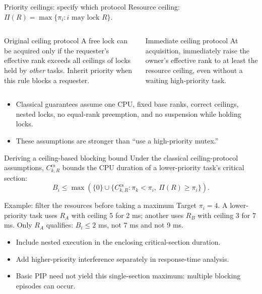 \documentclass[aspectratio=169,11pt]{beamer}
\begin{document}
\begin{frame}{Priority ceilings: specify which protocol}
  \small Resource ceiling: $\Pi(R)=\max\{\pi_i:i\text{ may lock }R\}$.
  \begin{columns}[T,onlytextwidth]
    \begin{block}{Original ceiling protocol}
      A free lock can be acquired only if the requester's effective rank exceeds all ceilings of locks held by \emph{other} tasks. Inherit priority when this rule blocks a requester.
    \end{block}
    \begin{block}{Immediate ceiling protocol}
      At acquisition, immediately raise the owner's effective rank to at least the resource ceiling, even without a waiting high-priority task.
    \end{block}
  \end{columns}
  \begin{itemize}
    \item Classical guarantees assume one CPU, fixed base ranks, correct ceilings, nested locks, no equal-rank preemption, and no suspension while holding locks.
    \item These assumptions are stronger than ``use a high-priority mutex.''
  \end{itemize}
\end{frame}

\begin{frame}{Deriving a ceiling-based blocking bound}
  \small Under the classical ceiling-protocol assumptions, $C_{k,R}^{\mathrm{cs}}$ bounds the CPU duration of a lower-priority task's critical section:
  \[
    B_i\le\max\left(\{0\}\cup
      \{C_{k,R}^{\mathrm{cs}}:\pi_k<\pi_i,\ \Pi(R)\ge\pi_i\}\right).
  \]
  \begin{block}{Example: filter the resources before taking a maximum}
    Target $\pi_i=4$. A lower-priority task uses $R_A$ with ceiling 5 for 2 ms; another uses $R_B$ with ceiling 3 for 7 ms. Only $R_A$ qualifies: $B_i\le2$ ms, not 7 ms and not 9 ms.
  \end{block}
  \begin{itemize}
    \item Include nested execution in the enclosing critical-section duration.
    \item Add higher-priority interference separately in response-time analysis.
    \item Basic PIP need not yield this single-section maximum: multiple blocking episodes can occur.
  \end{itemize}
\end{frame}
\end{document}
